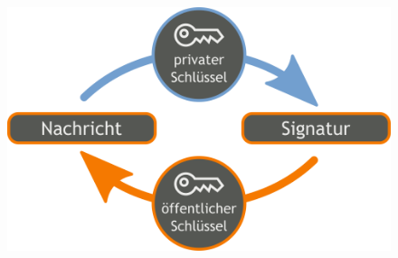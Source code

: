 \documentclass[xcolor=dvipsnames]{beamer}
\begin{document}
\begin{frame}
	\begin{figure}
	\center
	\includegraphics[scale=0.2]{digital_signature}
	\end{figure}
\end{frame}
\end{document}
